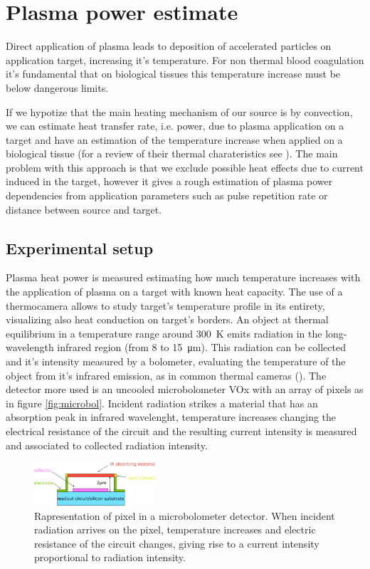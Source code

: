 \chapter{Plasma power estimate}
\label{ch:temperature}
Direct application of plasma leads to deposition of accelerated particles on application target, increasing it's temperature. For non thermal blood coagulation it's fundamental that on biological tissues this temperature increase must be below dangerous limits.

If we hypotize that the main heating mechanism of our source is by convection, we can estimate heat transfer rate, i.e. power, due to plasma application on a target and have an estimation of the temperature increase when applied on a biological tissue (for a review of their thermal charateristics see \cite{biotissues}). The main problem with this approach is that we exclude possible heat effects due to current induced in the target, however it gives a rough estimation of plasma power dependencies from application parameters such as pulse repetition rate or distance between source and target.

\section{Experimental setup}
Plasma heat power is measured estimating how much temperature increases with the application of plasma on a target with known heat capacity. The use of a thermocamera allows to study target's temperature profile in its entirety, visualizing also heat conduction on target's borders.
An object at thermal equilibrium in a temperature range around \SI{300}{\kelvin} emits radiation in the long-wavelength infrared region (from \num{8} to \SI{15}{\micro\meter}). This radiation can be collected and it's intensity measured by a bolometer, evaluating the temperature of the object from it's infrared emission, as in common thermal cameras (\cite{Gade2014}). The detector more used is an uncooled microbolometer VOx with an array of pixels as in figure \ref{fig:microbol}. Incident radiation strikes a material that has an absorption peak in infrared wavelenght, temperature increases changing the electrical resistance of the circuit and the resulting current intensity is measured and associated to collected radiation intensity.
\begin{figure}
 \centering
 \includegraphics[width=0.4\textwidth]{Images/Temperature/Microbolometer.png}
 \caption{Rapresentation of pixel in a microbolometer detector. When incident radiation arrives on the pixel, temperature increases and electric resistance of the circuit changes, giving rise to a current intensity proportional to radiation intensity.}
\end{figure}


